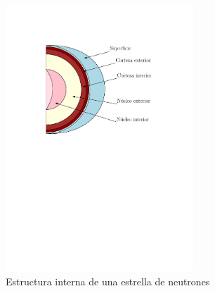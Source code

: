 \begin{figure}[H]
    \centering
    \includegraphics[width=200pt]{figures/neutronstar.pdf}
    \caption{Estructura interna de una estrella de neutrones}
    \label{NSS}
\end{figure}